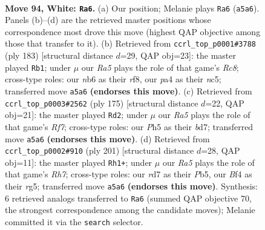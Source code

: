 \documentclass[11pt]{article}
\begin{document}
\clearpage

\begin{figure}[p]\centering
\begin{subfigure}{0.46\textwidth}\centering
\resizebox{\linewidth}{!}{%
\newchessgame
\chessboard[
  setfen={7k/3r4/1n3P2/R6P/p4B2/P7/7K/8 w - - 5 94},
  showmover=false,
  pgfstyle=straightmove, color=movearrow, markmove={a5-a6}
]}
\caption{}
\end{subfigure}\hfill
\begin{subfigure}{0.46\textwidth}\centering
\resizebox{\linewidth}{!}{%
\newchessgame
\chessboard[
  setfen={5R2/1P6/6k1/2NK3p/6pP/6b1/8/2r5 b - - 2 92},
  showmover=false,
  pgfstyle=straightmove, color=movearrow, markmove={c1-b1}
]}
\caption{}
\end{subfigure}
\\[4pt]
\begin{subfigure}{0.46\textwidth}\centering
\resizebox{\linewidth}{!}{%
\newchessgame
\chessboard[
  setfen={8/3B3k/8/2R3p1/7p/4N3/5rPK/1b6 b - - 3 88},
  showmover=false,
  pgfstyle=straightmove, color=movearrow, markmove={f2-d2}
]}
\caption{}
\end{subfigure}\hfill
\begin{subfigure}{0.46\textwidth}\centering
\resizebox{\linewidth}{!}{%
\newchessgame
\chessboard[
  setfen={8/8/2k5/pp4R1/8/P7/2N4r/1K6 b - - 5 101},
  showmover=false,
  pgfstyle=straightmove, color=movearrow, markmove={h2-h1}
]}
\caption{}
\end{subfigure}
\caption{\textbf{Move 94, White: \texttt{Ra6}.} (a) Our position; Melanie plays \texttt{Ra6} (\texttt{a5a6}). Panels (b)--(d) are the retrieved master positions whose correspondence most drove this move (highest QAP objective among those that transfer to it). (b) Retrieved from \texttt{ccrl\_top\_p0001\#3788} (ply 183) [structural distance $d$=29, QAP obj=23]: the master played \texttt{Rb1}; under $\mu$ our \emph{Ra5} plays the role of that game's \emph{Rc8}; cross-type roles: our \emph{n}b6 as their \emph{r}f8, our \emph{p}a4 as their \emph{n}c5; transferred move \texttt{a5a6} \textbf{(endorses this move)}. (c) Retrieved from \texttt{ccrl\_top\_p0003\#2562} (ply 175) [structural distance $d$=22, QAP obj=21]: the master played \texttt{Rd2}; under $\mu$ our \emph{Ra5} plays the role of that game's \emph{Rf7}; cross-type roles: our \emph{P}h5 as their \emph{b}d7; transferred move \texttt{a5a6} \textbf{(endorses this move)}. (d) Retrieved from \texttt{ccrl\_top\_p0002\#910} (ply 201) [structural distance $d$=28, QAP obj=11]: the master played \texttt{Rh1+}; under $\mu$ our \emph{Ra5} plays the role of that game's \emph{Rh7}; cross-type roles: our \emph{r}d7 as their \emph{P}b5, our \emph{B}f4 as their \emph{r}g5; transferred move \texttt{a5a6} \textbf{(endorses this move)}. Synthesis: 6 retrieved analogs transferred to \texttt{Ra6} (summed QAP objective 70, the strongest correspondence among the candidate moves); Melanie committed it via the \texttt{search} selector.}
\label{fig:thought-m186}
\end{figure}
\end{document}
